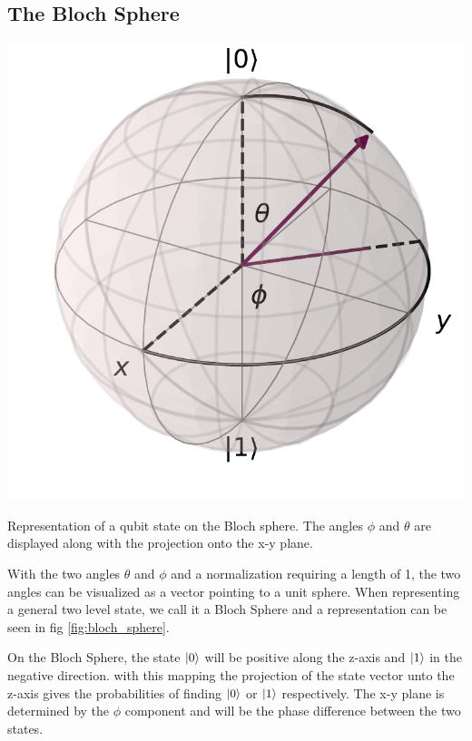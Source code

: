 \subsection{The Bloch Sphere}
\begin{marginfigure}[3 cm]
    \centering
    \includegraphics[]{Figs/Theory/bloch_sphere.pdf}
    \caption{Representation of a qubit state on the Bloch sphere. The angles $\phi$ and $\theta$ are displayed along with the projection onto the x-y plane.}
    \label{fig:bloch_sphere}
\end{marginfigure}
With the two angles $\theta$ and $\phi$ and a normalization requiring a length of 1, the two angles can be visualized as a vector pointing to a unit sphere. When representing a general two level state, we call it a Bloch Sphere and a representation can be seen in fig \ref{fig:bloch_sphere}.

On the Bloch Sphere, the state $\ket{0}$ will be positive along the z-axis and $\ket{1}$ in the negative direction. with this mapping the projection of the state vector unto the z-axis gives the probabilities of finding $\ket{0}$ or $\ket{1}$ respectively. The x-y plane is determined by the $\phi$ component and will be the phase difference between the two states. \cite{krantz_week_2019}




